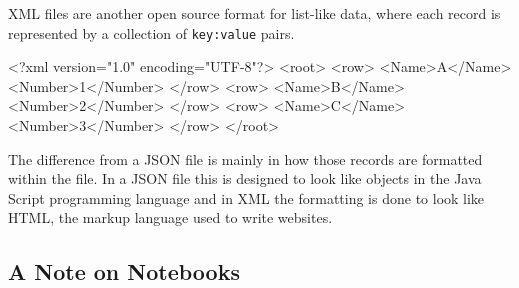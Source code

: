 \documentclass[
  letterpaper,
  DIV=11,
  numbers=noendperiod]{scrreprt}
\newenvironment{Shaded}{\begin{snugshade}}{\end{snugshade}}
\newcommand{\DataTypeTok}[1]{\textcolor[rgb]{0.68,0.00,0.00}{#1}}
\newcommand{\KeywordTok}[1]{\textcolor[rgb]{0.00,0.23,0.31}{#1}}
\newcommand{\NormalTok}[1]{\textcolor[rgb]{0.00,0.23,0.31}{#1}}
\begin{document}
XML files are another open source format for list-like data, where each
record is represented by a collection of \texttt{key:value} pairs.

\begin{Shaded}
\begin{Highlighting}[]
\KeywordTok{\textless{}?xml}\NormalTok{ version="1.0" encoding="UTF{-}8"}\KeywordTok{?\textgreater{}}
\DataTypeTok{\textless{}}\KeywordTok{root}\DataTypeTok{\textgreater{}}
  \DataTypeTok{\textless{}}\KeywordTok{row}\DataTypeTok{\textgreater{}}
    \DataTypeTok{\textless{}}\KeywordTok{Name}\DataTypeTok{\textgreater{}}\NormalTok{A}\DataTypeTok{\textless{}/}\KeywordTok{Name}\DataTypeTok{\textgreater{}}
    \DataTypeTok{\textless{}}\KeywordTok{Number}\DataTypeTok{\textgreater{}}\NormalTok{1}\DataTypeTok{\textless{}/}\KeywordTok{Number}\DataTypeTok{\textgreater{}}
  \DataTypeTok{\textless{}/}\KeywordTok{row}\DataTypeTok{\textgreater{}}
  \DataTypeTok{\textless{}}\KeywordTok{row}\DataTypeTok{\textgreater{}}
    \DataTypeTok{\textless{}}\KeywordTok{Name}\DataTypeTok{\textgreater{}}\NormalTok{B}\DataTypeTok{\textless{}/}\KeywordTok{Name}\DataTypeTok{\textgreater{}}
    \DataTypeTok{\textless{}}\KeywordTok{Number}\DataTypeTok{\textgreater{}}\NormalTok{2}\DataTypeTok{\textless{}/}\KeywordTok{Number}\DataTypeTok{\textgreater{}}
  \DataTypeTok{\textless{}/}\KeywordTok{row}\DataTypeTok{\textgreater{}}
  \DataTypeTok{\textless{}}\KeywordTok{row}\DataTypeTok{\textgreater{}}
    \DataTypeTok{\textless{}}\KeywordTok{Name}\DataTypeTok{\textgreater{}}\NormalTok{C}\DataTypeTok{\textless{}/}\KeywordTok{Name}\DataTypeTok{\textgreater{}}
    \DataTypeTok{\textless{}}\KeywordTok{Number}\DataTypeTok{\textgreater{}}\NormalTok{3}\DataTypeTok{\textless{}/}\KeywordTok{Number}\DataTypeTok{\textgreater{}}
  \DataTypeTok{\textless{}/}\KeywordTok{row}\DataTypeTok{\textgreater{}}
\DataTypeTok{\textless{}/}\KeywordTok{root}\DataTypeTok{\textgreater{}}
\end{Highlighting}
\end{Shaded}

The difference from a JSON file is mainly in how those records are
formatted within the file. In a JSON file this is designed to look like
objects in the Java Script programming language and in XML the
formatting is done to look like HTML, the markup language used to write
websites.

\subsection{A Note on Notebooks}\label{a-note-on-notebooks}
\end{document}
